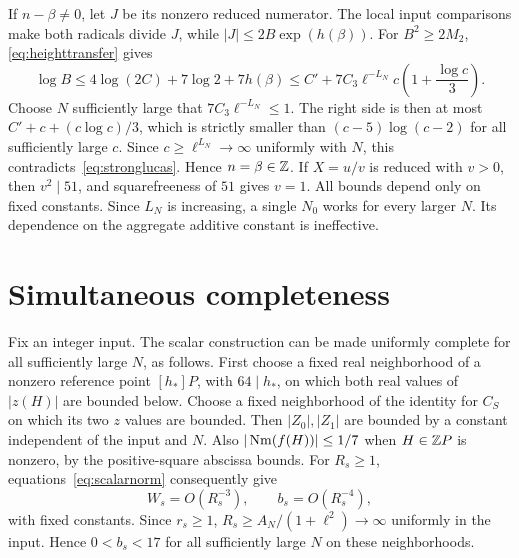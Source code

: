 \documentclass[11pt,a4paper]{article}
\begin{document}
If $n-\beta\ne0$, let $J$ be its nonzero reduced numerator.
The local input comparisons make both radicals divide $J$,
while $|J|\le2B\exp(h(\beta))$. For $B^2\ge2M_2$,
\eqref{eq:heighttransfer} gives
\[
 \log B\le4\log(2C)+7\log2+7h(\beta)
 \le C'+7C_3\ell^{-L_N}c\left(1+\frac{\log c}{3}\right).
\]
Choose $N$ sufficiently large that $7C_3\ell^{-L_N}\le1$.
The right side is then at most $C'+c+(c\log c)/3$, which is
strictly smaller than $(c-5)\log(c-2)$ for all sufficiently large
$c$. Since $c\ge\ell^{L_N}\to\infty$ uniformly with $N$,
this contradicts~\eqref{eq:stronglucas}.
Hence $n=\beta\in\mathbb Z$. If $X=u/v$ is reduced with $v>0$, then
$v^2\mid51$, and squarefreeness of $51$ gives $v=1$.
All bounds depend only on fixed constants. Since $L_N$ is increasing,
a single $N_0$ works for every larger $N$. Its dependence on the
aggregate additive constant is ineffective.

\section{Simultaneous completeness}
Fix an integer input. The scalar construction can be made uniformly
complete for all sufficiently large $N$, as follows. First choose a fixed
real neighborhood of a nonzero reference point $[h_*]P$, with
$64\mid h_*$, on which both real values of $|z(H)|$ are bounded below.
Choose a fixed neighborhood of the identity for $C_S$ on which its two
$z$ values are bounded. Then $|Z_0|,|Z_1|$ are bounded by a constant
independent of the input and $N$. Also $|\operatorname{Nm}(f(H))|\le1/7$ when
$H\in\mathbb Z P$ is nonzero, by the positive-square abscissa bounds.
For $R_s\ge1$, equations~\eqref{eq:scalarnorm} consequently give
\[
                 W_s=O(R_s^{-3}),\qquad b_s=O(R_s^{-4}),
\]
with fixed constants. Since $r_s\ge1$,
$R_s\ge A_N/(1+\ell^2)\to\infty$ uniformly in the input.
Hence $0<b_s<17$ for all sufficiently large $N$ on these neighborhoods.
\end{document}
